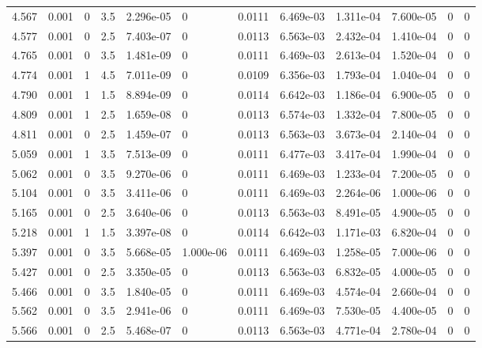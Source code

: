 \documentclass[preview]{standalone}
\begin{document}
{{{\begin{tabular}{L{1.2cm}C{1.2cm} C{0.3cm}C{0.5cm} C{1.4cm}C{1.4cm} C{1.4cm}C{1.4cm} C{1.6cm}C{1.6cm} C{1.6cm}C{1.6cm}}
  4.567  &  0.001  & 0     & 3.5 &  2.296e-05  & 0  &  0.0111&   6.469e-03& 1.311e-04 & 7.600e-05   &  0 & 0  \\ 
  4.577  &  0.001  & 0     & 2.5 &  7.403e-07  & 0  &  0.0113&   6.563e-03& 2.432e-04 & 1.410e-04   &  0 & 0  \\ 
  4.765  &  0.001  & 0     & 3.5 &  1.481e-09  & 0  &  0.0111&   6.469e-03& 2.613e-04 & 1.520e-04   &  0 & 0  \\ 
  4.774  &  0.001  & 1     & 4.5 &  7.011e-09  & 0  &  0.0109&   6.356e-03& 1.793e-04 & 1.040e-04   &  0 & 0  \\ 
  4.790  &  0.001  & 1     & 1.5 &  8.894e-09  & 0  &  0.0114&   6.642e-03& 1.186e-04 & 6.900e-05   &  0 & 0  \\ 
  4.809  &  0.001  & 1     & 2.5 &  1.659e-08  & 0  &  0.0113&   6.574e-03& 1.332e-04 & 7.800e-05   &  0 & 0  \\ 
  4.811  &  0.001  & 0     & 2.5 &  1.459e-07  & 0  &  0.0113&   6.563e-03& 3.673e-04 & 2.140e-04   &  0 & 0  \\ 
  5.059  &  0.001  & 1     & 3.5 &  7.513e-09  & 0  &  0.0111&   6.477e-03& 3.417e-04 & 1.990e-04   &  0 & 0  \\ 
  5.062  &  0.001  & 0     & 3.5 &  9.270e-06  & 0  &  0.0111&   6.469e-03& 1.233e-04 & 7.200e-05   &  0 & 0  \\ 
  5.104  &  0.001  & 0     & 3.5 &  3.411e-06  & 0  &  0.0111&   6.469e-03& 2.264e-06 & 1.000e-06   &  0 & 0  \\ 
  5.165  &  0.001  & 0     & 2.5 &  3.640e-06  & 0  &  0.0113&   6.563e-03& 8.491e-05 & 4.900e-05   &  0 & 0  \\ 
  5.218  &  0.001  & 1     & 1.5 &  3.397e-08  & 0  &  0.0114&   6.642e-03& 1.171e-03 & 6.820e-04   &  0 & 0  \\ 
  5.397  &  0.001  & 0     & 3.5 &  5.668e-05  & 1.000e-06  &  0.0111&   6.469e-03& 1.258e-05 & 7.000e-06   &  0 & 0  \\ 
  5.427  &  0.001  & 0     & 2.5 &  3.350e-05  & 0  &  0.0113&   6.563e-03& 6.832e-05 & 4.000e-05   &  0 & 0  \\ 
  5.466  &  0.001  & 0     & 3.5 &  1.840e-05  & 0  &  0.0111&   6.469e-03& 4.574e-04 & 2.660e-04   &  0 & 0  \\ 
  5.562  &  0.001  & 0     & 3.5 &  2.941e-06  & 0  &  0.0111&   6.469e-03& 7.530e-05 & 4.400e-05   &  0 & 0  \\ 
  5.566  &  0.001  & 0     & 2.5 &  5.468e-07  & 0  &  0.0113&   6.563e-03& 4.771e-04 & 2.780e-04   &  0 & 0  \\ 

\end{tabular}}}}
\end{document}
